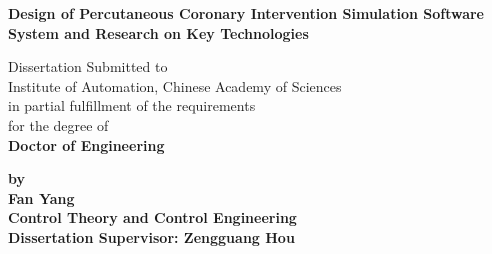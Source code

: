 
\thispagestyle{empty} %

\vspace*{0.5cm} %
\begin{center} \erhao \hei \textsf{\textbf{Design of Percutaneous Coronary Intervention Simulation Software System and Research on Key Technologies}}
\end{center}

\vspace*{0.5cm} %
\begin{center}
\sanhao Dissertation Submitted to\\
Institute of Automation, Chinese Academy of Sciences\\
in partial fulfillment of the requirements\\
for the degree of\\
\textsf{\textbf{Doctor of Engineering}}
\end{center}

\vspace{1.0cm}
\begin{center}
\textsf{\textbf{by}}\\
\textsf{\textbf{Fan Yang}}\\
\textsf{\textbf{Control Theory and Control Engineering}}\\
\vspace{1.0cm} \textsf{\textbf{Dissertation Supervisor: Zengguang Hou}}
\end{center}
